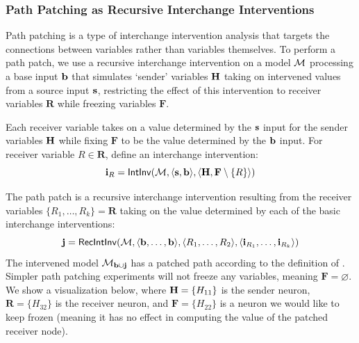 \documentclass[twoside,11pt]{article}
\begin{document}
\subsubsection{Path Patching as Recursive Interchange Interventions}


Path patching \citep{wang2023interpretability, goldowskydill2023localizing, Hanna:2023, zhang2024towards, prakash2024finetuning} is a type of interchange intervention analysis %
that targets the connections between variables rather than variables themselves. To perform a path patch, we use a recursive interchange intervention on a model $\mathcal{M}$ processing a base input $\mathbf{b}$ that simulates `sender' variables $\mathbf{H}$ taking on intervened values from a source input $\mathbf{s}$, restricting the effect of this intervention to receiver variables $\mathbf{R}$ while freezing variables $\mathbf{F}$. 

Each receiver variable takes on a value determined by the $\mathbf{s}$ input for the sender variables $\mathbf{H}$ while fixing $\mathbf{F}$ to be the value determined by the $\mathbf{b}$ input. For receiver variable $R \in \mathbf{R}$, define an interchange intervention: 
\[\mathbf{i}_{R} = \mathsf{IntInv}(\mathcal{M}, \langle \mathbf{s}, \mathbf{b} \rangle, \langle\mathbf{H}, \mathbf{F} \setminus \{R\}\rangle)\]

The path patch is a recursive interchange intervention resulting from the receiver variables $\{R_1, \dots, R_k\} = \mathbf{R}$ taking on the value determined by each of the basic interchange interventions:
\[\mathbf{j} = \mathsf{RecIntInv}(\mathcal{M}, \langle \mathbf{b}, \dots, \mathbf{b} \rangle, \langle R_1,\dots, R_2 \rangle, \langle \mathbf{i}_{R_1}, \dots, \mathbf{i}_{R_k}\rangle)\]
The intervened model $\mathcal{M}_{\mathbf{b} \cup \mathbf{j}}$ has a patched path according to the definition of \cite{wang2023interpretability}. Simpler path patching experiments will not freeze any variables, meaning $\mathbf{F} = \varnothing$. We show a visualization below, where $\mathbf{H} = \{H_{11}\}$ is the sender neuron, $\mathbf{R} = \{H_{32}\}$ is the receiver neuron, and  $\mathbf{F} = \{H_{22}\}$ is a neuron we would like to keep frozen (meaning it has no effect in computing the value of the patched receiver node).


\end{document}
